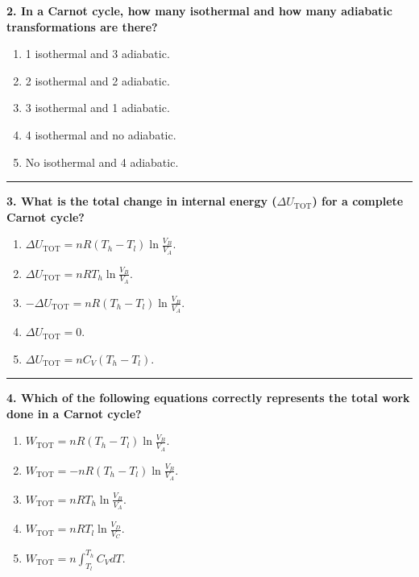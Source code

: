 \documentclass[
  9pt,
]{extbook}
\providecommand{\tightlist}{%
  \setlength{\itemsep}{0pt}\setlength{\parskip}{0pt}}
\theoremstyle{definition}
\theoremstyle{definition}
\theoremstyle{definition}
\theoremstyle{remark}
\begin{document}
\textbf{2. In a Carnot cycle, how many isothermal and how many adiabatic transformations are there?}

\begin{enumerate}
\def\labelenumi{\alph{enumi}.}
\tightlist
\item
  1 isothermal and 3 adiabatic.
\item
  2 isothermal and 2 adiabatic.
\item
  3 isothermal and 1 adiabatic.
\item
  4 isothermal and no adiabatic.
\item
  No isothermal and 4 adiabatic.
\end{enumerate}

\begin{center}\rule{0.5\linewidth}{0.5pt}\end{center}

\textbf{3. What is the total change in internal energy (\(\Delta U_{\text{TOT}}\)) for a complete Carnot cycle?}

\begin{enumerate}
\def\labelenumi{\alph{enumi}.}
\tightlist
\item
  \(\Delta U_{\text{TOT}}=nR(T_h - T_l)\ln\frac{V_B}{V_A}\).
\item
  \(\Delta U_{\text{TOT}}=nRT_h\ln\frac{V_B}{V_A}\).
\item
  \(-\Delta U_{\text{TOT}}=nR(T_h - T_l)\ln\frac{V_B}{V_A}\).
\item
  \(\Delta U_{\text{TOT}}=0\).
\item
  \(\Delta U_{\text{TOT}}=nC_V(T_h - T_l)\).
\end{enumerate}

\begin{center}\rule{0.5\linewidth}{0.5pt}\end{center}

\textbf{4. Which of the following equations correctly represents the total work done in a Carnot cycle?}

\begin{enumerate}
\def\labelenumi{\alph{enumi}.}
\tightlist
\item
  \(W_{\text{TOT}} = nR(T_h - T_l)\ln\frac{V_B}{V_A}\).
\item
  \(W_{\text{TOT}} = -nR(T_h - T_l)\ln\frac{V_B}{V_A}\).
\item
  \(W_{\text{TOT}} = nRT_h\ln\frac{V_B}{V_A}\).
\item
  \(W_{\text{TOT}} = nRT_l\ln\frac{V_D}{V_C}\).
\item
  \(W_{\text{TOT}} = n\int_{T_l}^{T_h}C_V dT\).
\end{enumerate}
\end{document}
